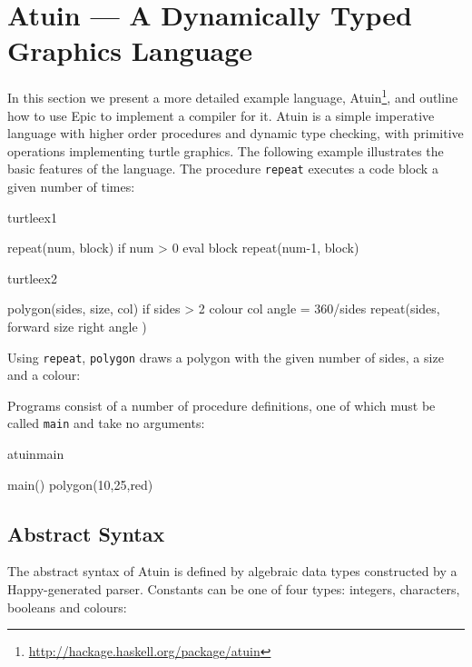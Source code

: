\section{Atuin --- A Dynamically Typed Graphics Language}

In this section we present a more detailed example language,
Atuin\footnote{\url{http://hackage.haskell.org/package/atuin}}, and
outline how to use Epic to implement a compiler for it. Atuin is a simple
imperative language with higher order procedures and dynamic type
checking, with primitive operations implementing turtle graphics.
The following example illustrates the basic features of the
language. The procedure \texttt{repeat} executes a code block a given
number of times:

\begin{SaveVerbatim}{turtleex1}

repeat(num, block) {
  if num > 0 {
     eval block
     repeat(num-1, block)
  }
}

\end{SaveVerbatim}
\begin{SaveVerbatim}{turtleex2}

polygon(sides, size, col) {
  if sides > 2 {
    colour col
    angle = 360/sides
    repeat(sides, {
      forward size
      right angle
    })
  }
}

\end{SaveVerbatim}


\noindent
Using \texttt{repeat}, \texttt{polygon} draws a polygon
with the given number of sides, a size and a colour:


\noindent
Programs consist of a number of procedure definitions, one of which
must be called \texttt{main} and take no arguments:

\begin{SaveVerbatim}{atuinmain}

main() {
  polygon(10,25,red)
}
\end{SaveVerbatim}

\subsection{Abstract Syntax}

The abstract syntax of Atuin is defined by algebraic data types
constructed by a Happy-generated parser. Constants can be one of four
types: integers, characters, booleans and colours:

